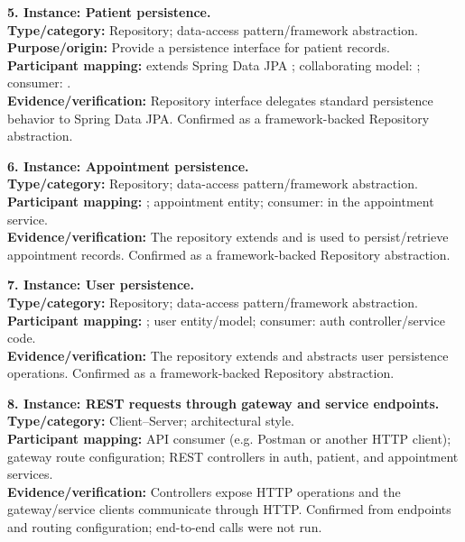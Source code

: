 \documentclass[11pt,a4paper]{article}
\begin{document}
\textbf{5. Instance: Patient persistence.}\\
\textbf{Type/category:} Repository; data-access pattern/framework abstraction.\\
\textbf{Purpose/origin:} Provide a persistence interface for patient records.\\
\textbf{Participant mapping:}  extends Spring Data JPA ; collaborating model: ; consumer: .\\
\textbf{Evidence/verification:} Repository interface delegates standard persistence behavior to Spring Data JPA. Confirmed as a framework-backed Repository abstraction.

\textbf{6. Instance: Appointment persistence.}\\
\textbf{Type/category:} Repository; data-access pattern/framework abstraction.\\
\textbf{Participant mapping:} ; appointment entity; consumer:  in the appointment service.\\
\textbf{Evidence/verification:} The repository extends  and is used to persist/retrieve appointment records. Confirmed as a framework-backed Repository abstraction.

\textbf{7. Instance: User persistence.}\\
\textbf{Type/category:} Repository; data-access pattern/framework abstraction.\\
\textbf{Participant mapping:} ; user entity/model; consumer: auth controller/service code.\\
\textbf{Evidence/verification:} The repository extends  and abstracts user persistence operations. Confirmed as a framework-backed Repository abstraction.

\textbf{8. Instance: REST requests through gateway and service endpoints.}\\
\textbf{Type/category:} Client--Server; architectural style.\\
\textbf{Participant mapping:} API consumer (e.g. Postman or another HTTP client); gateway route configuration; REST controllers in auth, patient, and appointment services.\\
\textbf{Evidence/verification:} Controllers expose HTTP operations and the gateway/service clients communicate through HTTP. Confirmed from endpoints and routing configuration; end-to-end calls were not run.
\end{document}
